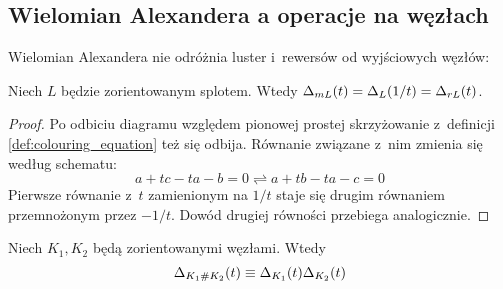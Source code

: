 
\subsection{Wielomian Alexandera a operacje na węzłach}

Wielomian Alexandera nie odróżnia luster i~rewersów od wyjściowych węzłów:

\begin{proposition}
%
%
    Niech $L$ będzie zorientowanym splotem.
    Wtedy $\Delta_{mL}(t) = \Delta_L(1/t) = \Delta_{rL}(t)$.
\end{proposition}

\begin{proof}
    Po odbiciu diagramu względem pionowej prostej skrzyżowanie z~definicji \ref{def:colouring_equation} też się odbija.
    Równanie związane z~nim zmienia się według schematu:
    \begin{equation}
        a + tc - ta - b = 0 \rightleftharpoons a + tb - ta - c = 0
    \end{equation}
    Pierwsze równanie z~$t$ zamienionym na $1/t$ staje się drugim równaniem przemnożonym przez $-1/t$.
    Dowód drugiej równości przebiega analogicznie.
\end{proof}

\begin{proposition}
\label{prp:alexander_multiplicative}%
    Niech $K_1, K_2$ będą zorientowanymi węzłami.
    Wtedy
    \begin{equation}
        \Delta_{K_1 \mathbin{\#} K_2}(t) \equiv \Delta_{K_1}(t) \Delta_{K_2}(t)
    \end{equation}
\end{proposition}

